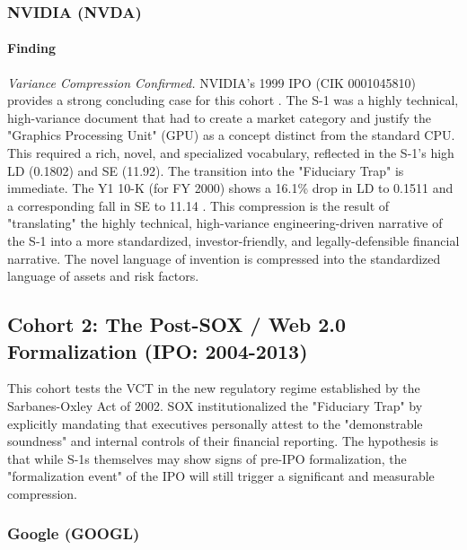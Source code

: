 \documentclass[12pt, letterpaper]{article}
\begin{document}
\subsubsection{NVIDIA (NVDA)}
\paragraph{Finding} \textit{Variance Compression Confirmed.}
NVIDIA's 1999 IPO (CIK 0001045810) provides a strong concluding case for this cohort \cite{key8}. The S-1 was a highly technical, high-variance document that had to create a market category and justify the "Graphics Processing Unit" (GPU) as a concept distinct from the standard CPU. This required a rich, novel, and specialized vocabulary, reflected in the S-1's high LD (0.1802) and SE (11.92). The transition into the "Fiduciary Trap" is immediate. The Y1 10-K (for FY 2000) shows a 16.1\% drop in LD to 0.1511 and a corresponding fall in SE to 11.14 \cite{key28}. This compression is the result of "translating" the highly technical, high-variance engineering-driven narrative of the S-1 into a more standardized, investor-friendly, and legally-defensible financial narrative. The novel language of invention is compressed into the standardized language of assets and risk factors.

\subsection{Cohort 2: The Post-SOX / Web 2.0 Formalization (IPO: 2004-2013)}
This cohort tests the VCT in the new regulatory regime established by the Sarbanes-Oxley Act of 2002. SOX institutionalized the "Fiduciary Trap" by explicitly mandating that executives personally attest to the "demonstrable soundness" and internal controls of their financial reporting. The hypothesis is that while S-1s themselves may show signs of pre-IPO formalization, the "formalization event" of the IPO will still trigger a significant and measurable compression.

\subsubsection{Google (GOOGL)}
\end{document}
